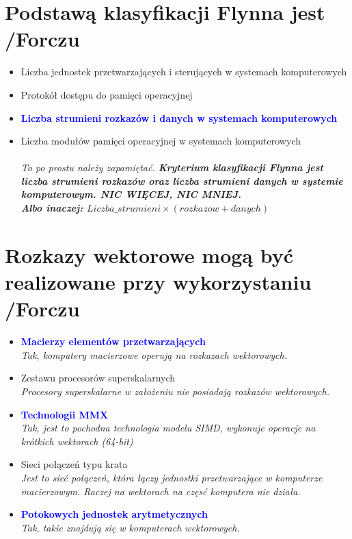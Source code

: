\documentclass[a4paper,twoside]{article}
\begin{document}
\section{Podstawą klasyfikacji Flynna jest {\small /Forczu}}
	\begin{itemize}
    \item Liczba jednostek przetwarzających i sterujących w systemach komputerowych
    \item Protokół dostępu do pamięci operacyjnej
    \item \textcolor{Blue}{\textbf{Liczba strumieni rozkazów i danych w systemach komputerowych}}
    \item Liczba modułów pamięci operacyjnej w systemach komputerowych\\\\
    {\small \emph{To po prostu należy zapamiętać. \textbf{Kryterium klasyfikacji Flynna jest \emph{liczba strumieni rozkazów} oraz \emph{liczba strumieni danych} w systemie komputerowym. NIC WIĘCEJ, NIC MNIEJ.\\
    Albo inaczej: \emph{$Liczba\_strumieni\times(rozkazow+danych)$}}}}
    \end{itemize}

\section{Rozkazy wektorowe mogą być realizowane przy wykorzystaniu  {\small /Forczu}}
	\begin{itemize}
    \item \textcolor{Blue}{\textbf{Macierzy elementów przetwarzających}}\\
    {\small \emph{Tak, komputery macierzowe operują na rozkazach wektorowych.}}
    \item Zestawu procesorów superskalarnych\\
    {\small \emph{Procesory superskalarne w założeniu nie posiadają rozkazów wektorowych.}}
    \item \textcolor{Blue}{\textbf{Technologii MMX}}\\
    {\small \emph{Tak, jest to pochodna technologia modelu SIMD, wykonuje operacje na krótkich wektorach (64-bit)}}
    \item Sieci połączeń typu krata\\
    {\small \emph{Jest to sieć połączeń, która łączy jednostki przetwarzające w komputerze macierzowym. Raczej na wektorach na częsć komputera nie działa.}}
    \item \textcolor{Blue}{\textbf{Potokowych jednostek arytmetycznych}}\\
    {\small \emph{Tak, takie znajdują się w komputerach wektorowych.}}
    \end{itemize}
\end{document}
